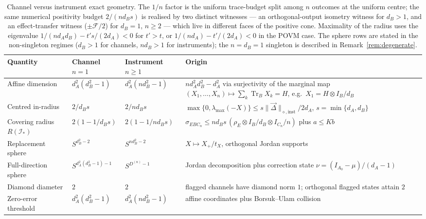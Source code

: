 \documentclass[11pt,a4paper]{article}
\newcommand{\Tr}{\operatorname{Tr}}
\newcommand{\vD}{\vec{\Delta}}
\begin{document}
\begin{table}[t]
\centering
\small
\setlength{\tabcolsep}{4pt}
\begin{tabular}{p{3.4cm}p{3.0cm}p{3.0cm}p{3.4cm}}
\toprule
Quantity & Channel $n=1$ & Instrument $n\ge1$ & Origin \\
\midrule
Affine dimension & $d_A^2(d_B^2-1)$ & $d_A^2(nd_B^2-1)$ & $nd_A^2d_B^2-d_A^2$ via surjectivity of the marginal map $(X_1,\dots,X_n)\mapsto\sum_k\Tr_BX_k=H$, e.g.\ $X_1=H\otimes I_B/d_B$\\
Centred in-radius & $2/d_Bs$ & $2/nd_Bs$ & $\max\{0,\lambda_{\max}(-X)\}\le s\|\vD\|_{\diamond,\mathrm{inst}}/2d_A$, $s=\min\{d_A,d_B\}$\\
Covering radius $R(\mathcal I_*)$ & $2(1-1/d_Bs)$ & $2(1-1/nd_Bs)$ & $\sigma_{EBC_n}\le nd_Bs\,(\rho_E\otimes I_B/d_B\otimes I_{C_n}/n)$ plus $a\le Kb$\\
Replacement sphere & $S^{d_B^2-2}$ & $S^{nd_B^2-2}$ & $X\mapsto X_+/t_X$, orthogonal Jordan supports\\
Full-direction sphere & $S^{d_A^2(d_B^2-1)-1}$ & $S^{D^{(n)}-1}$ & Jordan decomposition plus correction state $\nu=(I_{A_0}-\mu)/(d_A-1)$\\
Diamond diameter & $2$ & $2$ & flagged channels have diamond norm $1$; orthogonal flagged states attain $2$\\
Zero-error threshold & $d_A^2(d_B^2-1)$ & $d_A^2(nd_B^2-1)$ & affine coordinates plus Borsuk--Ulam collision\\
\bottomrule
\end{tabular}
\caption{Channel versus instrument exact geometry. The $1/n$ factor is the uniform trace-budget split among $n$ outcomes at the uniform centre; the same numerical positivity budget $2/(nd_Bs)$ is realised by two distinct witnesses --- an orthogonal-output isometry witness for $d_B>1$, and an effect-transfer witness ($\pm\mathcal F/2$) for $d_B=1$, $n\ge2$ --- which live in different faces of the positive cone. Maximality of the radius uses the eigenvalue $1/(nd_Ad_B)-t's/(2d_A)<0$ for $t'>t$, or $1/(nd_A)-t'/(2d_A)<0$ in the POVM case. The sphere rows are stated in the non-singleton regimes ($d_B>1$ for channels, $nd_B>1$ for instruments); the $n=d_B=1$ singleton is described in Remark~\ref{rem:degenerate}.}
\label{tab:comparison}
\end{table}
\end{document}
